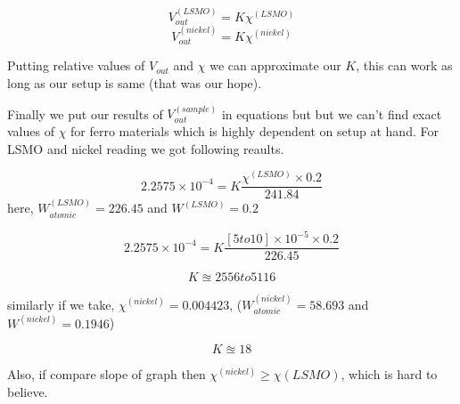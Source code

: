 \documentclass[a4paper,11pt]{article}
\begin{document}
\begin{equation*}
V_{out}^{(LSMO)} = K \chi^{(LSMO)}
\end{equation*}
\begin{equation*}
V_{out}^{(nickel)} = K \chi^{(nickel)}
\end{equation*}

Putting relative values of \(V_{out}\) and \(\chi\) we can approximate our \(K\), this can work as long as our setup is same (that was our hope).

Finally we put our results of \(V_{out}^{(sample)}\) in equations but but we can't find exact values of \(\chi\) for ferro materials which is highly dependent on setup at hand. For LSMO and nickel reading we got following reaults.


\begin{equation*}
2.2575 \times 10^{-4} =  K \frac{\chi^{(LSMO)} \times 0.2}{241.84}
\end{equation*}
here, \(W_{atomic}^{(LSMO)}=226.45\) and \(W^{(LSMO)}=0.2\) 

\begin{equation*}
2.2575 \times 10^{-4} = K \frac{[5 to 10] \times 10^{-5} \times 0.2}{226.45}
\end{equation*}


\begin{equation*}
K \approxeq 2556   to   5116
\end{equation*}

similarly if we take, \(\chi^{(nickel)}= 0.004423\), (\(W_{atomic}^{(nickel)}=58.693\) and \(W^{(nickel)} = 0.1946\))

\begin{equation*}
K \approxeq 18
\end{equation*}


Also, if compare slope of graph then \(\chi^{(nickel)} \ge \chi{(LSMO)}\), which is hard to believe.
\end{document}
